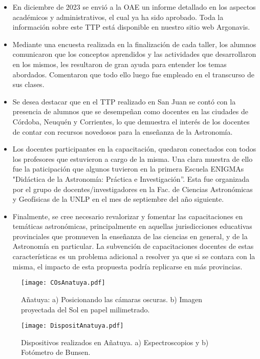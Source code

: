 \documentclass[baaa]{baaa}
\begin{document}
\begin{itemize}
\item En diciembre de 2023 se envi\'o a la OAE un informe detallado en los aspectos acad\'emicos y administrativos, el cual ya ha sido aprobado. Toda la informaci\'on sobre este TTP est\'a disponible en nuestro sitio web Argonavis.
\item Mediante una encuesta realizada en la finalizaci\'on de cada taller, los alumnos comunicaron que los conceptos aprendidos y las actividades que desarrollaron en los mismos, les resultaron de gran ayuda para entender los temas abordados. Comentaron que todo ello luego fue empleado en el transcurso de sus clases.
\item Se desea destacar que en el TTP realizado en San Juan se cont\'o con la presencia de alumnos que se desempe\~nan como docentes en las ciudades de C\'ordoba, Neuqu\'en y Corrientes, lo que demuestra el inter\'es de los docentes de contar con recursos novedosos para la ense\~nanza de la Astronom\'ia.
\item Los docentes participantes en la capacitaci\'on, quedaron conectados con todos los profesores que estuvieron a cargo de la misma. Una clara muestra de ello fue la paticipaci\'on que algunos tuvieron en la primera Escuela ENIGMAs "Did\'actica de la Astronom\'ia: Pr\'actica e Investigaci\'on''. Esta fue organizada por el grupo de docentes/investigadores en la Fac. de Ciencias Astron\'omicas y Geof\'isicas de la UNLP en el mes de septiembre del a\~no siguiente.
\item Finalmente, se cree necesario revalorizar y fomentar las capacitaciones en tem\'aticas astron\'omicas, principalmente en aquellas jurisdicciones educativas provinciales que promueven la ense\~nanza de las ciencias en general, y de la Astronom\'ia en particular. La subvenci\'on de capacitaciones docentes de estas caracter\'isticas es un problema adicional a resolver ya que si se contara con la misma, el impacto de esta propuesta podr\'ia replicarse en m\'as provincias. 
\end{itemize}

\begin{figure}[!t]
\centering
\texttt{[image: COsAnatuya.pdf]}
\caption{A\~natuya: a) Posicionando las c\'amaras oscuras. b) Imagen proyectada del Sol en papel milimetrado.}
\label{AnatuyaCO}
\end{figure}

\begin{figure}[!t]
\centering
\texttt{[image: DispositAnatuya.pdf]}
\caption{Dispositivos realizados en A\~natuya. a) Espectroscopios y b) Fot\'ometro de Bunsen. }
\label{Dispositivos}
\end{figure}
\end{document}
